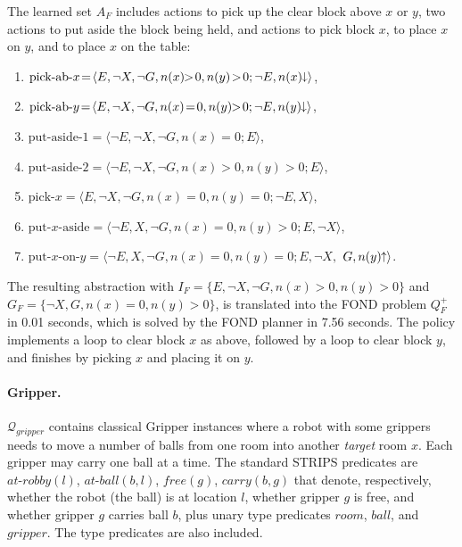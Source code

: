 \documentclass[letterpaper]{article} %
\newcommand{\tup}[1]{\langle #1 \rangle}
\newcommand{\Q}{\mathcal{Q}}
\newcommand{\abst}[2]{\tup{#1;#2}}
\newcommand{\pplus}{\hspace{-.05em}\raisebox{.15ex}{\footnotesize$\uparrow$}}
\newcommand{\mminus}{\hspace{-.05em}\raisebox{.15ex}{\footnotesize$\downarrow$}}
\begin{document}
The learned set $A_F$ includes actions to pick up the clear
block above $x$ or $y$, two actions to put aside the block being held,
and actions to pick block $x$, to place $x$ on $y$, and to place
$x$ on the table:
\begin{enumerate}[--]
  \item $\text{pick-ab-$x$}\!=\!\abst{E,\neg X,\neg G,n(x)\!\!>\!0,n(y)\!>\!0}{\neg E,n(x)\mminus}$,
  \item $\text{pick-ab-$y$}\!=\!\abst{E,\neg X,\neg G,n(x)\!=\!0,n(y)\!\!>\!0}{\neg E,n(y)\mminus}$,
  \item $\text{put-aside-1}=\abst{\neg E,\neg X,\neg G,n(x)=0}{E}$,
  \item $\text{put-aside-2}=\abst{\neg E,\neg X,\neg G,n(x)>0,n(y)>0}{E}$,
  \item $\text{pick-$x$}=\abst{E,\neg X,\neg G,n(x)=0,n(y)=0}{\neg E,X}$,
  \item $\text{put-$x$-aside}\!=\!\abst{\neg E,X,\neg G,n(x)=0,n(y)>0}{E,\neg X}$,
  \item $\text{put-$x$-on-$y$} = \langle \neg E, X, \neg G, n(x)=0, n(y)=0; E, \neg X,$ $G, n(y)\pplus \rangle$.
\end{enumerate}

The resulting abstraction with $I_F\!=\!\{ E, \neg X, \neg G, n(x)\!>\!0, n(y)\!>\!0\}$
and $G_F = \{ \neg X, G, n(x)=0, n(y)\!>\!0\}$, is translated into the FOND problem
$Q_F^+$  in 0.01 seconds,
which is solved by the FOND planner  in 7.56 seconds.
The policy implements a loop  to clear block $x$ as above, 
followed by a loop to clear block $y$, and finishes by picking
$x$ and placing it on $y$. 


\paragraph{Gripper.}
$\Q_{gripper}$ contains classical Gripper instances  where a robot with
some grippers needs to move a number of balls from one room into another
\emph{target} room $x$. Each gripper may carry one ball
at a time.
The standard STRIPS predicates are $at\text{-}robby(l)$, $at\text{-}ball(b,l)$,
$free(g)$, $carry(b,g)$ that denote, respectively, whether the robot
(the ball) is at location $l$, whether gripper $g$ is free, and whether
gripper $g$ carries ball $b$, plus unary type predicates $room$, $ball$,
and $gripper$. The type predicates are also included. 
\end{document}
